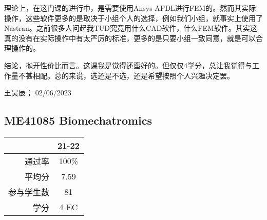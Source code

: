 理论上，在这门课的进行中，是需要使用Ansys APDL进行FEM的。然而其实际操作，这些软件更多的是取决于小组个人的选择，例如我们小组，就事实上使用了Nastran。之前很多人问起我TUD究竟用什么CAD软件，什么FEM软件。其实这真的没有在实际操作中有太严厉的标准，更多的是只要小组一致同意，就是可以合理操作的。

结论，抛开性价比而言。这课我是觉得还蛮好的。但仅仅4学分，总让我觉得与工作量不甚相配。总的来说，选还是不选，还是希望按照个人兴趣决定罢。
\begin{flushright}
王昊辰； 02/06/2023
\end{flushright}

\subsection{ME41085 Biomechatromics}
\begin{minipage}{0.45\textwidth}
\centering
{}
\end{minipage}%
\begin{minipage}{0.45\textwidth}
\raggedleft
\begin{tabular}{r|c}
\textbf{ } & \textbf{21-22} \\ \hline
通过率 & 100\% \\ 
平均分 & 7.59 \\ 
参与学生数 & 81 \\
学分 & 4 EC\\
\end{tabular}
\end{minipage}\\
